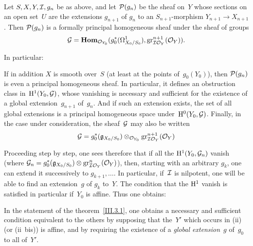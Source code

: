 \begin{corollary}
\label{III.5.3}
Let $S,X,Y,\cal{I},g_n$ be as above, and let $\cal{P}(g_n)$ be the sheaf
on~$Y$ whose sections on an open set~$U$ are the extensions $g_{n+1}$ of
$g_n$ to an $S_{n+1}$-morphism $Y_{n+1}\to X_{n+1}$. Then
$\cal{P}(g_n)$ is a formally principal homogeneous sheaf under the
sheaf of groups
\begin{equation*}
\cal{G}=\SheafHom_{\cal{O}_{Y_0}} (g_0^*(\Omega^1_{X_0/S_0}),
\gr_{\cal{I}\cal{O}_Y}^{n+1}(\cal{O}_Y)).
\end{equation*}
\end{corollary}

In particular:

\begin{corollary}
\label{III.5.4}
If in addition $X$ is smooth over~$S$ (at least at the points of~$g_0(Y_0)$),
then $\cal{P}(g_n)$ is even a principal homogeneous sheaf. In particular,
it defines an obstruction class in~$\H^1(Y_0,\cal{G})$, whose vanishing is
necessary and sufficient for the existence of a global extension~$g_{n+1}$
of~$g_n$. And if such an extension exists, the set of all global extensions
is a principal homogeneous space under~$\H^0(Y_0,\cal{G})$. Finally, in the
case under consideration, the sheaf~$\cal{G}$ may also be written
\begin{equation*}
\cal{G}=g_0^*(\goth{g}_{X_0/S_0})\otimes_{\cal{O}_{Y_0}}
\gr_{\cal{I}\cal{O}_Y}^{n+1}(\cal{O}_Y)
\end{equation*}
\end{corollary}

Proceeding step by step, one sees therefore that if all the
$\H^1(Y_0,\cal{G}_n)$ vanish (where
$\cal{G}_n=g_0^*(\goth{g}_{X_0/S_0})\otimes
\gr_{\cal{I}\cal{O}_Y}^{n}(\cal{O}_Y)$), then, starting with an arbitrary
$g_k$, one can extend it successively to $g_{k+1},\dots$. In particular,
if~$\cal{I}$ is nilpotent, one will be able to find an extension~$g$ of
$g_k$ to~$Y$. The condition that the $\H^1$ vanish is satisfied in
particular if~$Y_0$ is affine. Thus one obtains:

\begin{corollary}
\label{III.5.5}
In the statement of the theorem~\ref{III.3.1}, one obtains a necessary and
sufficient condition equivalent to the others by supposing that the~$Y'$
which occurs in \textup{(ii)} (or \textup{(ii~bis)}) is affine, and by
requiring the existence of a \emph{global extension}~$g$ of~$g_0$ to all
of~$Y'$.
\end{corollary}

